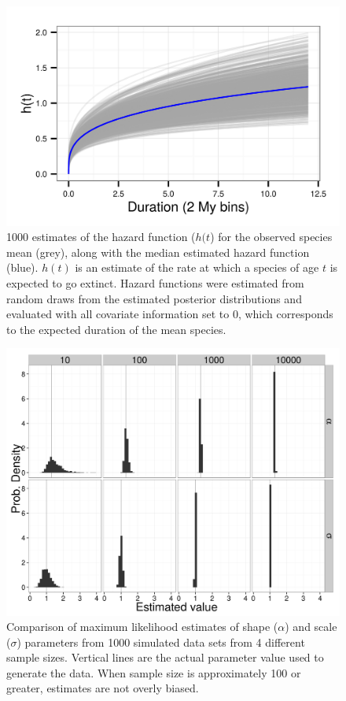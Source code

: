 \documentclass{article}
\begin{document}
\begin{figure}[ht]
  \centering
  \includegraphics[height = 0.5\textheight, width = \textwidth, keepaspectratio = true]{figure/haz_est}
  \caption{1000 estimates of the hazard function (\(h(t\)) for the observed species mean (grey), along with the median estimated hazard function (blue). \(h(t)\) is an estimate of the rate at which a species of age \(t\) is expected to go extinct. Hazard functions were estimated from random draws from the estimated posterior distributions and evaluated with all covariate information set to 0, which corresponds to the expected duration of the mean species.}
  \label{fig:haz}
\end{figure}

\begin{figure}[ht]
  \centering
  \includegraphics[height=0.5\textheight,width=\textwidth,keepaspectratio=true]{figure/alpha_simulation}
  \caption{Comparison of maximum likelihood estimates of shape (\(\alpha\)) and scale (\(\sigma\)) parameters from 1000 simulated data sets from 4 different sample sizes. Vertical lines are the actual parameter value used to generate the data. When sample size is approximately 100 or greater, estimates are not overly biased.}
  \label{fig:alpha_sims}
\end{figure}
\end{document}
